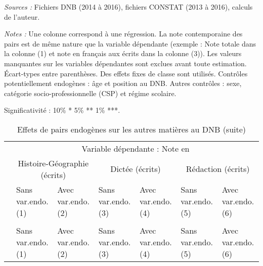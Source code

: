 \documentclass[
]{book}
\begin{document}
\begin{ThreePartTable}
\begin{TableNotes}
\item \textit{Sources :} Fichiers DNB (2014 à 2016), fichiers CONSTAT (2013 à 2016), calculs de l'auteur.
\item \textit{Notes :} Une colonne correspond à une régression. La note contemporaine des pairs est de même nature que la variable dépendante (exemple : Note totale dans la colonne (1) et note en français aux écrits dans la colonne (3)). Les valeurs manquantes sur les variables dépendantes sont exclues avant toute estimation. Écart-types entre parenthèses. Des effets fixes de classe sont utilisés. Contrôles potentiellement endogènes : âge et position au DNB. Autres contrôles : sexe, catégorie socio-professionnelle (CSP) et régime scolaire.
\item Significativité : 10\% * 5\% ** 1\% ***.
\end{TableNotes}
\begin{longtable}[t]{lllllll}
\caption{\label{tab:pepcmlmodelsssmoy}Effets de pairs endogènes sur les autres matières au DNB}\\
\toprule
\multicolumn{1}{c}{} & \multicolumn{6}{c}{Variable dépendante : Note en} \\
\cmidrule(l{3pt}r{3pt}){2-7}
\multicolumn{1}{c}{} & \multicolumn{2}{c}{Histoire-Géographie (écrits)} & \multicolumn{2}{c}{Dictée (écrits)} & \multicolumn{2}{c}{Rédaction (écrits)} \\
\cmidrule(l{3pt}r{3pt}){2-3} \cmidrule(l{3pt}r{3pt}){4-5} \cmidrule(l{3pt}r{3pt}){6-7}
 & \makecell{Sans var.endo. \\ (1) } & \makecell{Avec var.endo. \\ (2) } & \makecell{Sans var.endo. \\ (3) } & \makecell{Avec var.endo. \\ (4) } & \makecell{Sans var.endo. \\ (5) } & \makecell{Avec var.endo. \\ (6) }\\
\midrule
\endfirsthead
\caption[]{\label{tab:pepcmlmodelsssmoy}Effets de pairs endogènes sur les autres matières au DNB (suite)}\\
\toprule
 & \makecell{Sans var.endo. \\ (1) } & \makecell{Avec var.endo. \\ (2) } & \makecell{Sans var.endo. \\ (3) } & \makecell{Avec var.endo. \\ (4) } & \makecell{Sans var.endo. \\ (5) } & \makecell{Avec var.endo. \\ (6) }\\
\midrule
\endhead


\end{longtable}
\end{ThreePartTable}
\end{document}
